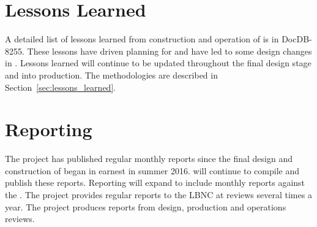 \section{Lessons Learned}
\label{sec:fdsp-coord-lessons}

A detailed list of lessons learned from construction and operation of
 is in DocDB-8255. These lessons have driven planning for
 and have led to some design changes in
. Lessons learned will continue to be updated throughout
the final design stage and into production. The methodologies are
described in Section~\ref{sec:lessons_learned}.


\section{Reporting}
\label{sec:fdsp-coord-reporting}

The  project has published regular monthly reports since
the final design and construction of  began in
earnest in summer 2016.  will continue to compile and publish these
reports. Reporting will expand to include monthly reports against the
. The  project provides regular reports to the
LBNC at reviews several times a year. The  project
produces reports from design, production and operations reviews.

